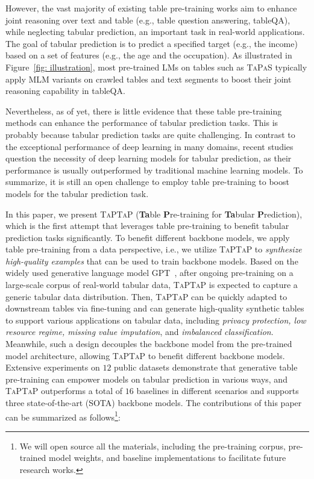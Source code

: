 However, the vast majority of existing table pre-training works aim to enhance joint reasoning over text and table (e.g., table question answering, tableQA), while neglecting tabular prediction, an important task in real-world applications. The goal of tabular prediction is to predict a specified target (e.g., the income) based on a set of features (e.g., the age and the occupation). As illustrated in Figure~\ref{fig: illustration}, most pre-trained LMs on tables such as \textsc{TaPaS} \citep{herzig-etal-2020-tapas} typically apply MLM variants on crawled tables and text segments to boost their joint reasoning capability in tableQA.

Nevertheless, as of yet, there is little evidence that these table pre-training methods can enhance the performance of tabular prediction tasks. This is probably because tabular prediction tasks are quite challenging. In contrast to the exceptional performance of deep learning in many domains, recent studies~\citep{deeplearning-not,revisiting} question the necessity of deep learning models for tabular prediction, as their performance is usually outperformed by traditional machine learning models. To summarize, it is still an open challenge to employ table pre-training to boost models for the tabular prediction task.

In this paper, we present \textsc{TaPTaP} (\textbf{Ta}ble \textbf{P}re-training for \textbf{Ta}bular \textbf{P}rediction), which is the first attempt that leverages table pre-training to benefit tabular prediction tasks significantly. To benefit different backbone models, we apply table pre-training from a data perspective, i.e., we utilize \textsc{TaPTaP} to \textit{synthesize high-quality examples} that can be used to train backbone models. Based on the widely used generative language model GPT~\citep{GPT2}, after ongoing pre-training on a large-scale corpus of real-world tabular data, \textsc{TaPTaP} is expected to capture a generic tabular data distribution. Then, \textsc{TaPTaP} can be quickly adapted to downstream tables via fine-tuning and can generate high-quality synthetic tables to support various applications on tabular data, including \textit{privacy protection, low resource regime, missing value imputation}, and \textit{imbalanced classification}. Meanwhile, such a design decouples the backbone model from the pre-trained model architecture, allowing \textsc{TaPTaP} to benefit different backbone models. Extensive experiments on $12$ public datasets demonstrate that generative table pre-training can empower models on tabular prediction in various ways, and \textsc{TaPTaP} outperforms a total of $16$ baselines in different scenarios and supports three state-of-the-art (SOTA) backbone models. The contributions of this paper can be summarized as follows\footnote{We will open source all the materials, including the pre-training corpus, pre-trained model weights, and baseline implementations to facilitate future research works.}:

